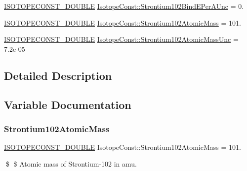 \begin{DoxyCompactItemize}
\mbox{\hyperlink{group___isotope_const-_macros_ga8f45a7272ce02c0b4c65c44636ed719a}{I\+S\+O\+T\+O\+P\+E\+C\+O\+N\+S\+T\+\_\+\+D\+O\+U\+B\+LE}} \mbox{\hyperlink{group___isotope_const-_strontium-_sr102_ga9f76928178fda5e4509e88817b0fec8e}{Isotope\+Const\+::\+Strontium102\+Bind\+E\+Per\+A\+Unc}} = 0.
\item 
\mbox{\hyperlink{group___isotope_const-_macros_ga8f45a7272ce02c0b4c65c44636ed719a}{I\+S\+O\+T\+O\+P\+E\+C\+O\+N\+S\+T\+\_\+\+D\+O\+U\+B\+LE}} \mbox{\hyperlink{group___isotope_const-_strontium-_sr102_ga0407ba05339bc52e4918aa7d9cc7e63f}{Isotope\+Const\+::\+Strontium102\+Atomic\+Mass}} = 101.
\item 
\mbox{\hyperlink{group___isotope_const-_macros_ga8f45a7272ce02c0b4c65c44636ed719a}{I\+S\+O\+T\+O\+P\+E\+C\+O\+N\+S\+T\+\_\+\+D\+O\+U\+B\+LE}} \mbox{\hyperlink{group___isotope_const-_strontium-_sr102_gaa6585b6bccc3653bbd4ddc79e04a60b3}{Isotope\+Const\+::\+Strontium102\+Atomic\+Mass\+Unc}} = 7.\+2e-\/05
\end{DoxyCompactItemize}


\subsection{Detailed Description}


\subsection{Variable Documentation}
\mbox{\label{group___isotope_const-_strontium-_sr102_ga0407ba05339bc52e4918aa7d9cc7e63f}} 
\subsubsection{\texorpdfstring{Strontium102\+Atomic\+Mass}{Strontium102AtomicMass}}
{\footnotesize\ttfamily \mbox{\hyperlink{group___isotope_const-_macros_ga8f45a7272ce02c0b4c65c44636ed719a}{I\+S\+O\+T\+O\+P\+E\+C\+O\+N\+S\+T\+\_\+\+D\+O\+U\+B\+LE}} Isotope\+Const\+::\+Strontium102\+Atomic\+Mass = 101.}

\$ \$ Atomic mass of Strontium-\/102 in amu. \mbox{\label{group___isotope_const-_strontium-_sr102_gaa6585b6bccc3653bbd4ddc79e04a60b3}} 
